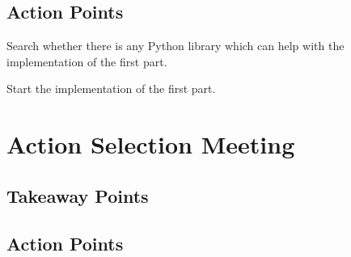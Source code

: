 \documentclass{article}
\begin{document}
{\addtolength{\leftskip}{3mm}
\subsection*{Action Points}
}
\begin{compactenum}
\item Search whether there is any Python library which can help with the implementation of the first part.
\item Start the implementation of the first part.
\end{compactenum}

\section*{Action Selection Meeting}

{\addtolength{\leftskip}{3mm}
\subsection*{Takeaway Points}
}
\begin{compactenum}
\item
\end{compactenum}

{\addtolength{\leftskip}{3mm}
\subsection*{Action Points}
}
\begin{compactenum}
\item
\end{compactenum}
\end{document}
